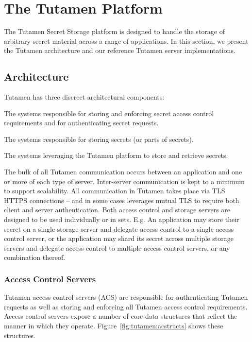 \section{The Tutamen Platform}
\label{sec:tutamen}

The Tutamen Secret Storage platform is designed to handle the storage
of arbitrary secret material across a range of applications. In this
section, we present the Tutamen architecture and our reference Tutamen
server implementations.

\subsection{Architecture}
\label{sec:tutamen:arch}

Tutamen has three discreet architectural components:

\begin{packed_desc}
\item[Access Control Servers (ACS):] The systems responsible for
  storing and enforcing secret access control requirements and for
  authenticating secret requests.
\item[Storage Servers (SS):] The systems responsible for storing
  secrets (or parts of secrets).
\item[Applications:] The systems leveraging the Tutamen platform to
  store and retrieve secrets.
\end{packed_desc}

The bulk of all Tutamen communication occurs between an application
and one or more of each type of server. Inter-server communication is
kept to a minimum to support scalability. All communication in Tutamen
takes place via TLS~\cite{dierks2008} HTTPS connections -- and in some
cases leverages mutual TLS to require both client and server
authentication. Both access control and storage servers are designed
to be used individually or in sets. E.g. An application may store
their secret on a single storage server and delegate access control to
a single access control server, or the application may shard its
secret across multiple storage servers and delegate access control to
multiple access control servers, or any combination thereof.

\subsubsection{Access Control Servers}
\label{sec:tutamen:arch:acs}

Tutamen access control servers (ACS) are responsible for
authenticating Tutamen requests as well as storing and enforcing all
Tutamen access control requirements. Access control servers expose a
number of core data structures that reflect the manner in which they
operate. Figure~\ref{fig:tutamen:acstructs} shows these structures.

